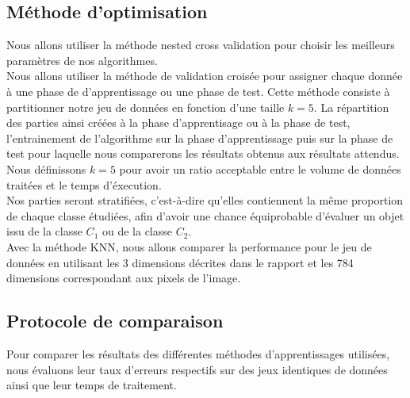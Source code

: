 \documentclass[a4paper,10pt]{article}
\begin{document}
	\subsection{Méthode d'optimisation}
		Nous allons utiliser la méthode nested cross validation pour choisir les meilleurs paramètres de nos algorithmes.\\
		Nous allons utiliser la méthode de validation croisée pour assigner chaque donnée à une phase de d'apprentissage ou une phase de test. Cette méthode consiste à partitionner notre jeu de données en fonction d'une taille $k=5$. La répartition des parties ainsi créées à la phase d'apprentisage ou à la phase de test, l'entrainement de l'algorithme sur la phase d'apprentissage puis sur la phase de test pour laquelle nous comparerons les résultats obtenus aux résultats attendus. \\
		Nous définissons $k=5$ pour avoir un ratio acceptable entre le volume de données traitées et le temps d'éxecution.\\
		Nos parties seront stratifiées, c'est-à-dire qu'elles contiennent la même proportion de chaque classe étudiées, afin d'avoir une chance équiprobable d'évaluer un objet issu de la classe $C_1$ ou de la classe $C_2$.\\
		Avec la méthode KNN, nous allons comparer la performance pour le jeu de données en utilisant les 3 dimensions décrites dans le rapport et les 784 dimensions correspondant aux pixels de l'image. 
	\subsection{Protocole de comparaison}
		Pour comparer les résultats des différentes méthodes d'apprentissages utilisées, nous évaluons leur taux d’erreurs respectifs sur des jeux identiques de données ainsi que leur temps de traitement.
\end{document}

